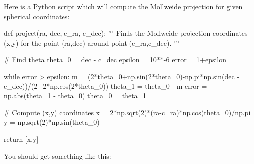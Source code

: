 \documentclass[paper=a4, fontsize=11pt]{scrartcl} %
\begin{document}
Here is a Python script which will compute the Mollweide projection for given spherical coordinates:
\begin{python}

def project(ra, dec, c_ra, c_dec):
	'''
	Finds the Mollweide projection coordinates (x,y) for the point (ra,dec) around 
	point (c_ra,c_dec).
	'''
	
	# Find theta
	theta_0 = dec - c_dec
	epsilon = 10**-6
	error = 1+epsilon
	
	while error > epsilon:
	    m = (2*theta_0+np.sin(2*theta_0)-np.pi*np.sin(dec - c_dec))/(2+2*np.cos(2*theta_0))
	    theta_1 = theta_0 - m
	    error = np.abs(theta_1 - theta_0)
	    theta_0 = theta_1
	
	# Compute (x,y) coordinates
	x = 2*np.sqrt(2)*(ra-c_ra)*np.cos(theta_0)/np.pi
	y = np.sqrt(2)*np.sin(theta_0)
	
	return [x,y]
\end{python}


You should get something like this:
\begin{figure}[!h]
\captionsetup{labelformat=empty}
\caption{}
\end{figure}
\end{document}

